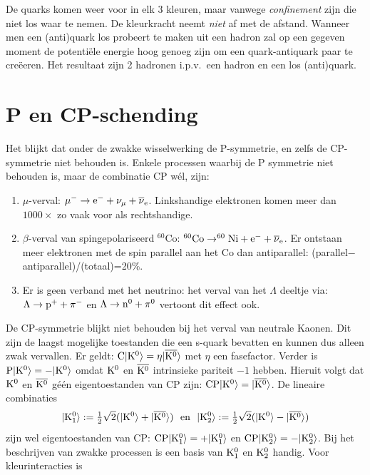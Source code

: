 \documentclass[twoside]{report}
\begin{document}
De quarks komen weer voor in elk 3 kleuren, maar vanwege {\it confinement}
zijn die niet los waar te nemen. De kleurkracht neemt {\it niet} af met de
afstand. Wanneer men een (anti)quark los probeert te maken uit een hadron zal
op een gegeven moment de potenti\"ele energie hoog genoeg zijn om een
quark-antiquark paar te cre\"eeren. Het resultaat zijn 2 hadronen i.p.v.\ een
hadron en een los (anti)quark.

\section[~~P en CP-schending]{P en CP-schending}
Het blijkt dat onder de zwakke wisselwerking de P-symmetrie, en zelfs de
CP-symmetrie niet behouden is. Enkele processen waarbij de P symmetrie niet
behouden is, maar de combinatie CP w\'el, zijn:
\begin{enumerate}
\item $\mu$-verval: $\mu^-\rightarrow {\rm e}^-+\nu_\mu+\overline{\nu}_{\rm e}$.
      Linkshandige elektronen komen meer dan $1000\times$ zo vaak voor als
      rechtshandige.
\item $\beta$-verval van spingepolariseerd $^{60}$Co:
      $\rm ^{60}Co\rightarrow^{60}Ni+e^-+\overline{\nu}_e$. Er ontstaan meer
      elektronen met de spin parallel aan het Co dan antiparallel:
      (parallel$-$antiparallel)/(totaal)=20\%.
\item Er is geen verband met het neutrino: het verval van het $\Lambda$
      deeltje via: $\Lambda\rightarrow{\rm p}^++\pi^-$ en
      $\Lambda\rightarrow{\rm n}^0+\pi^0$ vertoont dit effect ook.
\end{enumerate}
De CP-symmetrie blijkt niet behouden bij het verval van neutrale Kaonen. Dit
zijn de laagst mogelijke toestanden die een s-quark bevatten en kunnen dus
alleen zwak vervallen. Er geldt: $\rm C|K^0\rangle=\eta|\overline{K^0}\rangle$
met $\eta$ een fasefactor. Verder is $\rm P|K^0\rangle=-|K^0\rangle$ omdat
$\rm K^0$ en $\rm\overline{K^0}$ intrinsieke pariteit $-1$ hebben. Hieruit
volgt dat $\rm K^0$ en $\rm\overline{K^0}$ g\'e\'en eigentoestanden van CP
zijn: $\rm CP|K^0\rangle=|\overline{K^0}\rangle$. De lineaire combinaties
\[
\rm|K_1^0\rangle:=\mbox{$\frac{1}{2}$}\sqrt{2}(|K^0\rangle+|\overline{K^0}\rangle)~~\mbox{en}~~
|K_2^0\rangle:=\mbox{$\frac{1}{2}$}\sqrt{2}(|K^0\rangle-|\overline{K^0}\rangle)
\]
zijn wel eigentoestanden van CP: $\rm CP|K_1^0\rangle=+|K_1^0\rangle$ en
$\rm CP|K_2^0\rangle=-|K_2^0\rangle$. Bij het beschrijven van zwakke processen
is een basis van $\rm K_1^0$ en $\rm K_2^0$ handig. Voor kleurinteracties is
\end{document}
